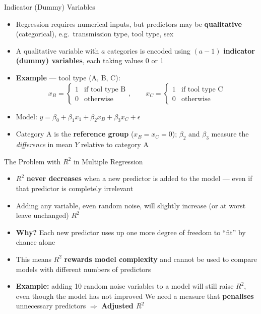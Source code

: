 \documentclass[12pt, aspectratio=169]{beamer}
\begin{document}
    \begin{frame}{Indicator (Dummy) Variables}
        \begin{itemize}
            \item Regression requires numerical inputs, but predictors may be \textbf{qualitative} (categorical), e.g.\ transmission type, tool type, sex
            \item A qualitative variable with $a$ categories is encoded using $(a - 1)$ \textbf{indicator (dummy) variables}, each taking values 0 or 1
            \item \textbf{Example} --- tool type (A, B, C):
                \[
                    x_B = \begin{cases} 1 & \text{if tool type B} \\ 0 & \text{otherwise} \end{cases},
                    \qquad
                    x_C = \begin{cases} 1 & \text{if tool type C} \\ 0 & \text{otherwise} \end{cases}
                \]
            \item Model: $y = \beta_0 + \beta_1 x_1 + \beta_2 x_B + \beta_3 x_C + \epsilon$
            \item Category A is the \textbf{reference group} ($x_B = x_C = 0$); $\beta_2$ and $\beta_3$ measure the \emph{difference} in mean $Y$ relative to category A
        \end{itemize}
    \end{frame}


    \begin{frame}{The Problem with $R^2$ in Multiple Regression}
        \begin{itemize}
            \item $R^2$ \textbf{never decreases} when a new predictor is added to the model --- even if that predictor is completely irrelevant
            \item Adding any variable, even random noise, will slightly increase (or at worst leave unchanged) $R^2$
            \item \textbf{Why?} Each new predictor uses up one more degree of freedom to ``fit'' by chance alone
            \item This means $R^2$ \textbf{rewards model complexity} and cannot be used to compare models with different numbers of predictors
            \item \textbf{Example:} adding 10 random noise variables to a model will still raise  $R^2$, even though the model has not improved We need a measure that \textbf{penalises} unnecessary predictors $\Rightarrow$ \textbf{Adjusted $R^2$}
        \end{itemize}
    \end{frame}
\end{document}
